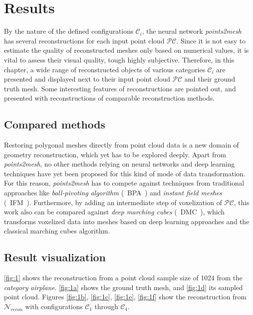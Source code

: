 \chapter{Results}
\label{chap:results}

    By the nature of the defined configurations $\mathcal{C}_i$, the neural network
    \emph{points2mesh} has several reconstructions for each input point cloud $\mathcal{PC}$.
    Since it is not easy to estimate the quality of reconstructed meshes only based on numerical
    values, it is vital to assess their visual quality, tough highly subjective.
    Therefore, in this chapter, a wide range of reconstructed objects of various categories $\mathcal{C}_i$
    are presented and displayed next to their input point cloud $\mathcal{PC}$ and their ground 
    truth mesh. Some interesting features of reconstructions are pointed out, and presented with reconstructions of comparable
    reconstruction methods.
    
\section{Compared methods}

Restoring polygonal meshes directly from point cloud data is a new domain of geometry reconstruction, 
which yet has to be explored deeply. Apart from \emph{points2mesh}, no other methods relying on neural 
networks and deep learning techniques have yet been proposed for this kind of mode of data transformation.
For this reason, \emph{points2mesh} has to compete against techniques from traditional approaches like
\emph{ball-pivoting algorithm} \cite{817351}(~BPA~) and \emph{instant field meshes} \cite{Jakob2015Instant} (~IFM~). Furthermore, by adding
an intermediate step of voxelization of $\mathcal{PC}$, this work also can be compared against 
\emph{deep marching cubes} \cite{Liao2018CVPR} (~DMC~), which transforms voxelized data into meshes based on deep learning approaches and the classical
marching cubes algorithm.

\section{Result visualization}
  \ref{fig:1} shows the reconstruction from a point cloud sample size of 1024 from the \emph{category}
  \emph{airplane}. \ref{fig:1a} shows the ground truth mesh, and \ref{fig:1d} its sampled point cloud. Figures
  \ref{fig:1b}, \ref{fig:1c}, \ref{fig:1e}, \ref{fig:1f} show the reconstruction from $\mathcal{N}_{recon}$ with 
  configurations $\mathcal{C}_1$ through $\mathcal{C}_4$.

